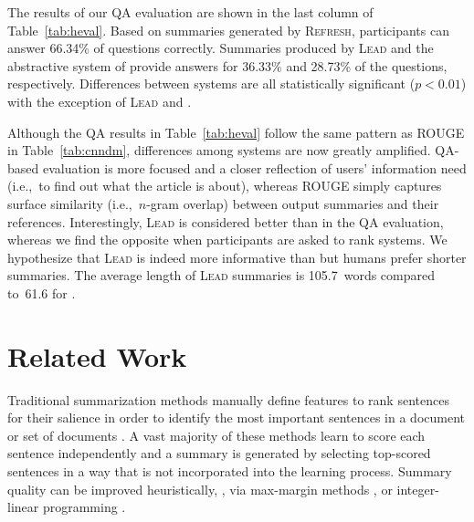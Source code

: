 \documentclass[11pt,a4paper]{article}
\newcommand\refresh{\textsc{Refresh}}
\begin{document}
The results of our QA evaluation are shown in the last column of
Table~\ref{tab:heval}. Based on summaries generated by \refresh,
participants can answer 66.34\% of questions correctly. Summaries
produced by \textsc{Lead} and the abstractive system of
 provide answers for 36.33\% and 28.73\% of the
questions, respectively. Differences between systems are all
statistically significant (\mbox{$p < 0.01$}) with the exception of
\textsc{Lead} and .


Although the QA results in Table~\ref{tab:heval} follow the same
pattern as ROUGE in Table~\ref{tab:cnndm}, differences among systems
are now greatly amplified. QA-based evaluation is more focused and a
closer reflection of users' information need (i.e.,~to find out what
the article is about), whereas ROUGE simply captures surface
similarity (i.e.,~\mbox{$n$-gram} overlap) between output summaries
and their references.  Interestingly, \textsc{Lead} is considered
better than  in the QA evaluation, whereas we find
the opposite when participants are asked to rank systems. We
hypothesize that \textsc{Lead} is indeed more informative than
 but humans prefer shorter summaries. The average
length of \textsc{Lead} summaries is 105.7~words compared to~61.6 for
.






\section{Related Work}


Traditional summarization methods manually define features to rank
sentences for their salience in order to identify the most important
sentences in a document or set of documents
\cite{Kupiec:1995binary,mani2001automatic,radev-lrec2004,filatova-04event,nenkova-06,SparckJones:2007}.
A vast majority of these methods learn to score each sentence
independently
\cite{Barzilay97usinglexical,Teufel97sentenceextraction,erkan:2004:lexrank,Mihalcea04TextRank,Shen:2007:IJCAI,Schilder:2008:fastsum,Wan:2010:urank}
and a summary is generated by selecting top-scored sentences in a way
that is not incorporated into the learning process. Summary quality
can be improved heuristically, \cite{Yih:2007:MSM}, via max-margin
methods \cite{Carbonell:1998:UMD,Li:2009:EDC}, or integer-linear
programming
\cite{woodsend-acl10,berg:2011,Woodsend:2012:emnlp,Almeida:acl13,parveen:2015:tgraph}. 
\end{document}
